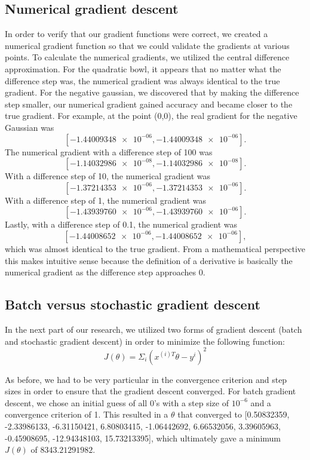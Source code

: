 \documentclass{article}
\begin{document}
\subsection{Numerical gradient descent}
In order to verify that our gradient functions were correct, we created a numerical gradient function so that we could validate the gradients at various points. To calculate the numerical gradients, we utilized the central difference approximation. For the quadratic bowl, it appears that no matter what the difference step was, the numerical gradient was always identical to the true gradient. For the negative gaussian, we discovered that by making the difference step smaller, our numerical gradient gained accuracy and became closer to the true gradient. For example, at the point (0,0), the real gradient for the negative Gaussian was $$[ \num{-1.44009348e-06}, \num{-1.44009348e-06}].$$
The numerical gradient with a difference step of 100 was $$[ \num{-1.14032986e-08} , \num{-1.14032986e-08}].$$
With a difference step of 10, the numerical gradient was $$[ \num{-1.37214353e-06},  \num{-1.37214353e-06}].$$
With a difference step of 1, the numerical gradient was $$[ \num{-1.43939760e-06},  \num{-1.43939760e-06}].$$
Lastly, with a difference step of 0.1, the numerical gradient was
$$[ \num{-1.44008652e-06}, \num{-1.44008652e-06}],$$ which was almost identical to the true gradient. From a mathematical perspective this makes intuitive sense because the definition of a derivative is basically the numerical gradient as the difference step approaches 0.

\subsection{Batch versus stochastic gradient descent}
In the next part of our research, we utilized two forms of gradient descent (batch and stochastic gradient descent) in order to minimize the following function:
$$J(\theta) = \Sigma_{i}(x^{(i)T}\theta - y^{i})^2$$

As before, we had to be very particular in the convergence criterion and step sizes in order to ensure that the gradient descent converged. For batch gradient descent, we chose an initial guess of all $0$'s with a step size of $10^{-6}$ and a convergence criterion of 1. This resulted in a $\theta$ that converged to [0.50832359, -2.33986133, -6.31150421, 6.80803415, -1.06442692, 6.66532056, 3.39605963, -0.45908695, -12.94348103, 15.73213395], which ultimately gave a minimum $J(\theta)$ of $8343.21291982$.
\end{document}
